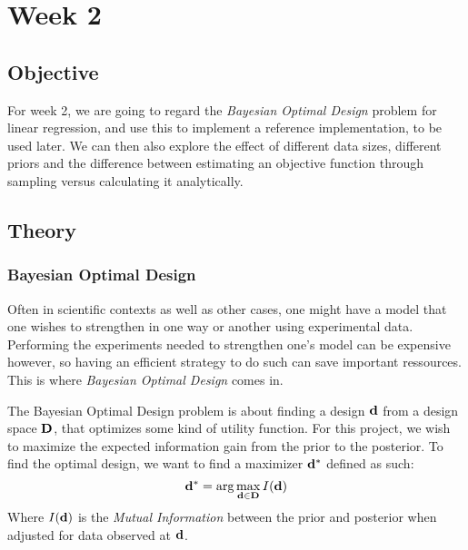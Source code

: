 \section{Week 2}
\subsection{Objective}
For week 2, we are going to regard the \textit{Bayesian Optimal Design} problem for linear regression, and use this to implement a reference implementation, to be used later.
We can then also explore the effect of different data sizes, different priors and the difference between estimating an objective function through sampling versus calculating it analytically.
\subsection{Theory}
\subsubsection{Bayesian Optimal Design}
Often in scientific contexts as well as other cases, one might have a model that one wishes to strengthen in one way or another using experimental data.
Performing the experiments needed to strengthen one's model can be expensive however, so having an efficient strategy to do such can save important ressources.
This is where \textit{Bayesian Optimal Design} comes in.

The Bayesian Optimal Design problem is about finding a design $\mathbf{d}$ from a design space $\mathbf{D}$, that optimizes some kind of utility function.\cite{ryan15} 
For this project, we wish to maximize the expected information gain from the prior to the posterior.
To find the optimal design, we want to find a maximizer $\mathbf{d}^*$ defined as such:
\begin{equation}\mathbf{d}^* = \arg \max_{\mathbf{d}\in \mathbf{D}} I(\mathbf{d})\end{equation}
Where $I(\mathbf{d})$ is the \textit{Mutual Information} between the prior and posterior when adjusted for data observed at $\mathbf{d}$.\\
